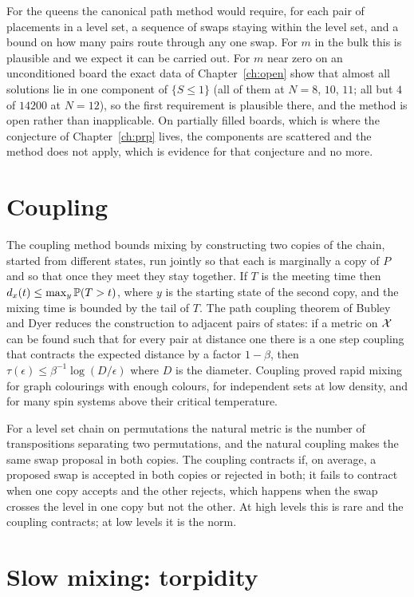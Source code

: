 For the queens the canonical path method would require, for each pair of placements in a level set, a sequence of swaps staying within the level set, and a bound on how many pairs route through any one swap. For $m$ in the bulk this is plausible and we expect it can be carried out. For $m$ near zero on an unconditioned board the exact data of Chapter~\ref{ch:open} show that almost all solutions lie in one component of $\{ S \le 1 \}$ (all of them at $N = 8$, $10$, $11$; all but $4$ of $14200$ at $N = 12$), so the first requirement is plausible there, and the method is open rather than inapplicable. On partially filled boards, which is where the conjecture of Chapter~\ref{ch:prp} lives, the components are scattered and the method does not apply, which is evidence for that conjecture and no more.

\section{Coupling}

The coupling method bounds mixing by constructing two copies of the chain, started from different states, run jointly so that each is marginally a copy of $P$ and so that once they meet they stay together. If $T$ is the meeting time then $d_x(t) \le \max_y \mathbb{P}(T > t)$, where $y$ is the starting state of the second copy, and the mixing time is bounded by the tail of $T$. The path coupling theorem of Bubley and Dyer reduces the construction to adjacent pairs of states: if a metric on $\mathcal{X}$ can be found such that for every pair at distance one there is a one step coupling that contracts the expected distance by a factor $1 - \beta$, then $\tau(\epsilon) \le \beta^{-1} \log( D / \epsilon )$ where $D$ is the diameter. Coupling proved rapid mixing for graph colourings with enough colours, for independent sets at low density, and for many spin systems above their critical temperature.

For a level set chain on permutations the natural metric is the number of transpositions separating two permutations, and the natural coupling makes the same swap proposal in both copies. The coupling contracts if, on average, a proposed swap is accepted in both copies or rejected in both; it fails to contract when one copy accepts and the other rejects, which happens when the swap crosses the level in one copy but not the other. At high levels this is rare and the coupling contracts; at low levels it is the norm.

\section{Slow mixing: torpidity}


